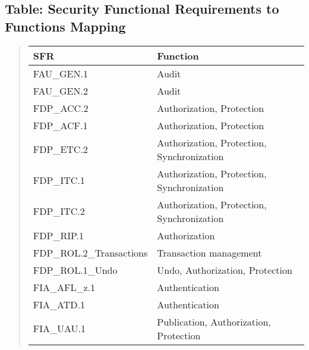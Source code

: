 \documentclass[10pt,a4paper,english]{article}
\newlength{\locallinewidth}
\begin{document}

\hypertarget{table-security-functional-requirements-to-functions-mapping}{}
\subsection*{Table: Security Functional Requirements to Functions Mapping}
\begin{quote}

\begin{longtable}[c]{|p{0.27\locallinewidth}|p{0.59\locallinewidth}|}
\hline
\textbf{
SFR
} & \textbf{
Function
} \\
\hline
\endhead

FAU{\_}GEN.1
 & 
Audit
 \\
\hline

FAU{\_}GEN.2
 & 
Audit
 \\
\hline

FDP{\_}ACC.2
 & 
Authorization, Protection
 \\
\hline

FDP{\_}ACF.1
 & 
Authorization, Protection
 \\
\hline

FDP{\_}ETC.2
 & 
Authorization, Protection, Synchronization
 \\
\hline

FDP{\_}ITC.1
 & 
Authorization, Protection, Synchronization
 \\
\hline

FDP{\_}ITC.2
 & 
Authorization, Protection, Synchronization
 \\
\hline

FDP{\_}RIP.1
 & 
Authorization
 \\
\hline

FDP{\_}ROL.2{\_}Transactions
 & 
Transaction management
 \\
\hline

FDP{\_}ROL.1{\_}Undo
 & 
Undo, Authorization, Protection
 \\
\hline

FIA{\_}AFL{\_}z.1
 & 
Authentication
 \\
\hline

FIA{\_}ATD.1
 & 
Authentication
 \\
\hline

FIA{\_}UAU.1
 & 
Publication, Authorization, Protection
 \\
\hline


\end{longtable}
\end{quote}
\end{document}

